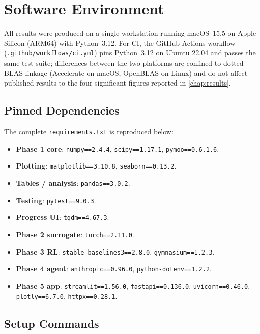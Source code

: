 \section{Software Environment}
\label{app:repro:env}

All results were produced on a single workstation running
macOS~\num{15.5} on Apple Silicon (ARM64) with Python~\num{3.12}.
For CI, the GitHub Actions workflow
(\texttt{.github/workflows/ci.yml}) pins Python~\num{3.12} on
Ubuntu \num{22.04} and passes the same test suite; differences
between the two platforms are confined to dotted BLAS linkage
(Accelerate on macOS, OpenBLAS on Linux) and do not affect
published results to the four significant figures reported in
\cref{chap:results}.

\subsection{Pinned Dependencies}
\label{app:repro:env:pins}

The complete \texttt{requirements.txt} is reproduced below:
\begin{itemize}
  \item \textbf{Phase 1 core}: \texttt{numpy==2.4.4},
        \texttt{scipy==1.17.1}, \texttt{pymoo==0.6.1.6}.
  \item \textbf{Plotting}: \texttt{matplotlib==3.10.8},
        \texttt{seaborn==0.13.2}.
  \item \textbf{Tables / analysis}: \texttt{pandas==3.0.2}.
  \item \textbf{Testing}: \texttt{pytest==9.0.3}.
  \item \textbf{Progress UI}: \texttt{tqdm==4.67.3}.
  \item \textbf{Phase 2 surrogate}: \texttt{torch==2.11.0}.
  \item \textbf{Phase 3 RL}: \texttt{stable-baselines3==2.8.0},
        \texttt{gymnasium==1.2.3}.
  \item \textbf{Phase 4 agent}: \texttt{anthropic==0.96.0},
        \texttt{python-dotenv==1.2.2}.
  \item \textbf{Phase 5 app}: \texttt{streamlit==1.56.0},
        \texttt{fastapi==0.136.0}, \texttt{uvicorn==0.46.0},
        \texttt{plotly==6.7.0}, \texttt{httpx==0.28.1}.
\end{itemize}

\subsection{Setup Commands}
\label{app:repro:env:setup}

